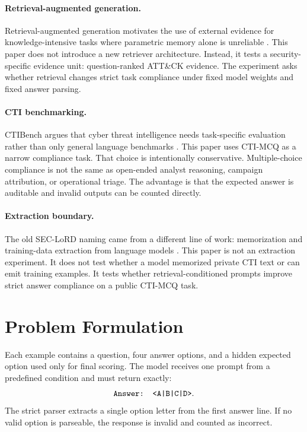 \documentclass[10pt]{article}
\begin{document}
\paragraph{Retrieval-augmented generation.}
Retrieval-augmented generation motivates the use of external evidence for knowledge-intensive tasks where parametric memory alone is unreliable \cite{lewis2020rag}.
This paper does not introduce a new retriever architecture.
Instead, it tests a security-specific evidence unit: question-ranked ATT\&CK evidence.
The experiment asks whether retrieval changes strict task compliance under fixed model weights and fixed answer parsing.

\paragraph{CTI benchmarking.}
CTIBench argues that cyber threat intelligence needs task-specific evaluation rather than only general language benchmarks \cite{alam2024ctibench}.
This paper uses CTI-MCQ as a narrow compliance task.
That choice is intentionally conservative.
Multiple-choice compliance is not the same as open-ended analyst reasoning, campaign attribution, or operational triage.
The advantage is that the expected answer is auditable and invalid outputs can be counted directly.

\paragraph{Extraction boundary.}
The old SEC-LoRD naming came from a different line of work: memorization and training-data extraction from language models \cite{carlini2021extracting}.
This paper is not an extraction experiment.
It does not test whether a model memorized private CTI text or can emit training examples.
It tests whether retrieval-conditioned prompts improve strict answer compliance on a public CTI-MCQ task.

\section{Problem Formulation}

Each example contains a question, four answer options, and a hidden expected option used only for final scoring.
The model receives one prompt from a predefined condition and must return exactly:
\[
\text{\texttt{Answer: <A|B|C|D>}}.
\]
The strict parser extracts a single option letter from the first answer line.
If no valid option is parseable, the response is invalid and counted as incorrect.
\end{document}
